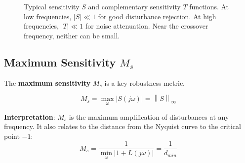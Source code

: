 \begin{figure}[htbp]
\centering
{}
\caption{Typical sensitivity $S$ and complementary sensitivity $T$ functions. At low frequencies, $|S| \ll 1$ for good disturbance rejection. At high frequencies, $|T| \ll 1$ for noise attenuation. Near the crossover frequency, neither can be small.}
\label{fig:sensitivity_functions}
\end{figure}

\subsection{Maximum Sensitivity $M_s$}

The \textbf{maximum sensitivity} $M_s$ is a key robustness metric.

\begin{definition}
\begin{equation}
    M_s = \max_{\omega} |S(j\omega)| = \left\| S \right\|_\infty
\end{equation}
\end{definition}

\textbf{Interpretation}: $M_s$ is the maximum amplification of disturbances at any frequency. It also relates to the distance from the Nyquist curve to the critical point $-1$:
\begin{equation}
    M_s = \frac{1}{\min_{\omega} |1 + L(j\omega)|} = \frac{1}{d_{min}}
\end{equation}

